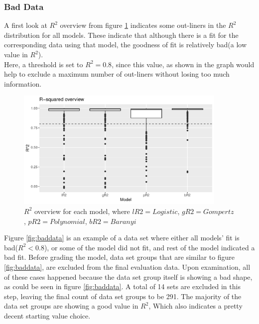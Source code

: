 \documentclass[11pt]{article}
\begin{document}
\subsubsection{Bad Data}
A first look at $R^2$ overview from figure \ref{fig:r2} indicates some out-liners in the $R^2$ distribution for all models. These indicate that although there is a fit for the corresponding data using that model, the goodness of fit is relatively bad(a low value in $R^2$).\\
Here, a threshold is set to $R^2 = 0.8$, since this value, as shown in the graph would help to exclude a maximum number of out-liners without losing too much information.
\FloatBarrier
\begin{figure}[!htbp]
    \centering
    \includegraphics[width=0.9\textwidth]{../Results/anaPlots/r2snap.pdf}
    \caption{$R^2$ overview for each model, where $lR2=Logistic$, $gR2=Gompertz$, $pR2=Polynomial$, $bR2=Baranyi$}
    \label{fig:r2}
\end{figure}
\FloatBarrier
Figure \ref{fig:baddata} is an example of a data set where either all models' fit is bad($R^2 < 0.8$), or some of the model did not fit, and rest of the model indicated a bad fit. Before grading the model, data set groups that are similar to figure \ref{fig:baddata}, are excluded from the final evaluation data. Upon examination, all of these cases happened because the data set group itself is showing a bad shape, as could be seen in figure \ref{fig:baddata}. A total of 14 sets are excluded in this step, leaving the final count of data set groups to be 291. The majority of the data set groups are showing a good value in $R^2$, Which also indicates a pretty decent starting value choice.
\FloatBarrier
\end{document}

